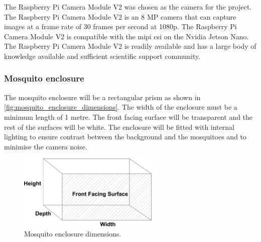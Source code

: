 The Raspberry Pi Camera Module V2 was chosen as the camera for the project. The Raspberry Pi Camera Module V2 is an 8 MP camera that can capture images at a frame rate of 30 frames per second at 1080p. The Raspberry Pi Camera Module V2 is compatible with the \gls{mipi} \gls{csi} on the Nvidia Jetson Nano. The Raspberry Pi Camera Module V2 is readily available and has a large body of knowledge available and sufficient scientific support community.



\subsubsection{Mosquito enclosure}
The mosquito enclosure will be a rectangular prism as shown in \autoref{fig:mosquito_enclosure_dimensions}. The width of the enclosure must be a minimum length of 1 metre. The front facing surface will be transparent and the rest of the surfaces will be white. The enclosure will be fitted with internal lighting to ensure contrast between the background and the mosquitoes and to minimise the camera noise.
\begin{figure}[h]
  \centering
  \includegraphics[width=0.6\textwidth]{figures/hardware_design/mos_enclosure.pdf}
  \caption{Mosquito enclosure dimensions.}
  \label{fig:mosquito_enclosure_dimensions}
\end{figure}



